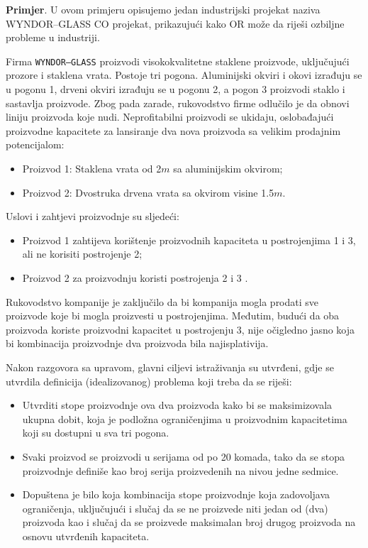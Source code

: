 \documentclass[a4paper, utf8, 11pt, colorlinks]{book}
\begin{document}
\textbf{Primjer}. U ovom primjeru opisujemo jedan industrijski projekat 
naziva {WYNDOR--GLASS CO projekat}, prikazujući kako OR može da riješi ozbiljne probleme u industriji. 
  
Firma \texttt{WYNDOR--GLASS} proizvodi visokokvalitetne staklene proizvode, uključujući prozore i staklena vrata. Postoje tri pogona. Aluminijski okviri i okovi izrađuju se u pogonu 1, drveni okviri izrađuju se u pogonu 2, a pogon 3 proizvodi staklo i sastavlja proizvode.
Zbog pada zarade, rukovodstvo firme   odlučilo je da obnovi liniju proizvoda koje nudi. Neprofitabilni proizvodi se ukidaju, oslobađajući proizvodne kapacitete za lansiranje dva nova proizvoda sa velikim prodajnim potencijalom:
\begin{itemize}
    \item Proizvod 1: Staklena vrata od 2$m$ sa aluminijskim okvirom;
    \item Proizvod 2: Dvostruka drvena vrata sa okvirom visine 1.5$m$.
\end{itemize}
Uslovi i zahtjevi proizvodnje su sljedeći:
\begin{itemize}
    \item Proizvod 1 zahtijeva   korištenje proizvodnih kapaciteta u postrojenjima 1 i 3, ali ne korisiti postrojenje 2; 
    \item Proizvod 2 za proizvodnju koristi   postrojenja 2 i 3 . 
\end{itemize}
    Rukovodstvo kompanije je zaključilo da bi kompanija mogla prodati sve proizvode koje bi mogla proizvesti u postrojenjima. Međutim, budući da   oba proizvoda koriste proizvodni kapacitet u postrojenju 3, nije očigledno jasno koja bi kombinacija proizvodnje dva proizvoda bila najisplativija. %

Nakon razgovora sa upravom, glavni ciljevi istraživanja su utvrđeni, gdje se utvrdila definicija  (idealizovanog) problema koji treba da se riješi:
\begin{itemize}
    \item Utvrditi  stope proizvodnje  ova dva proizvoda kako bi se maksimizovala ukupna dobit, koja je podložna ograničenjima u  proizvodnim kapacitetima koji su dostupni u sva tri pogona. 
    \item Svaki proizvod se proizvodi u serijama od po 20 komada, tako da se stopa proizvodnje definiše kao broj serija proizvedenih na nivou jedne sedmice. 
    \item Dopuštena je bilo koja kombinacija stope proizvodnje koja zadovoljava ograničenja, uključujući i slučaj da se ne proizvede niti jedan od (dva) proizvoda kao i slučaj da se proizvede maksimalan broj drugog proizvoda na osnovu utvrđenih kapaciteta.
\end{itemize}
\end{document}
